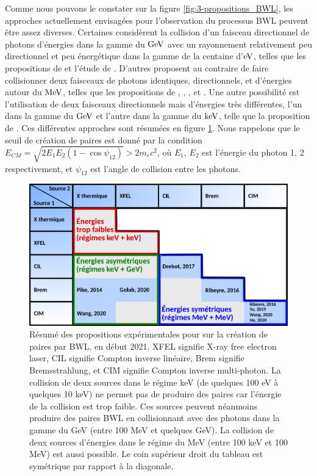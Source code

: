\begin{refsection}
Comme nous pouvons le constater sur la figure \ref{fig:3-propositions_BWL}, les approches actuellement envisagées pour l'observation du processus BWL peuvent être assez diverses. Certaines considèrent la collision d'un faisceau directionnel de photons d'énergies dans la gamme du $\rm GeV$ avec un rayonnement relativement peu directionnel et peu énergétique dans la gamme de la centaine d'$\rm eV$, telles que les propositions de \cite{pike_2014} et l'étude de \cite{wang_2020}. D'autres proposent au contraire de faire collisionner deux faisceaux de photons identiques, directionnels, et d'énergies autour du $\rm MeV$, telles que les propositions de \cite{ribeyre_2016}, \cite{drebot_2017}, \cite{yu_2019},  \cite{wang_2020} et \cite{he_2020}. Une autre possibilité est l'utilisation de deux faisceaux directionnels mais d'énergies très différentes, l'un dans la gamme du $\rm GeV$ et l'autre dans la gamme du $\rm keV$, telle que la proposition de \cite{golub_2020}. Ces différentes approches sont résumées en figure \ref{fig:3-tableau_propositions}. Nous rappelons que le seuil de création de paires est donné par la condition $E_{CM} = \sqrt{2 E_1 E_2 (1-\cos{\psi_{12}})}>2 m_e c^2$, où $E_1$, $E_2$ est l'énergie du photon 1, 2 respectivement, et $\psi_{12}$ est l'angle de collision entre les photons.

\begin{figure}[t]
	\centering
	\includegraphics[width=\linewidth]{3-experience/tableau_experiences.png}
	\caption{Résumé des propositions expérimentales pour sur la création de paires par BWL, en début 2021. XFEL signifie X-ray free electron laser, CIL signifie Compton inverse linéaire, Brem signifie Bremsstrahlung, et CIM signifie Compton inverse multi-photon. La collision de deux sources dans le régime keV (de quelques 100 eV à quelques 10 keV) ne permet pas de produire des paires car l'énergie de la collision est trop faible. Ces sources peuvent néanmoins produire des paires BWL en collisionnant avec des photons dans la gamme du GeV (entre 100 MeV et quelques GeV). La collision de deux sources d'énergies dans le régime du MeV (entre 100 keV et 100 MeV) est aussi possible. Le coin supérieur droit du tableau est symétrique par rapport à la diagonale.}
	\label{fig:3-tableau_propositions}
\end{figure}


\end{refsection}
